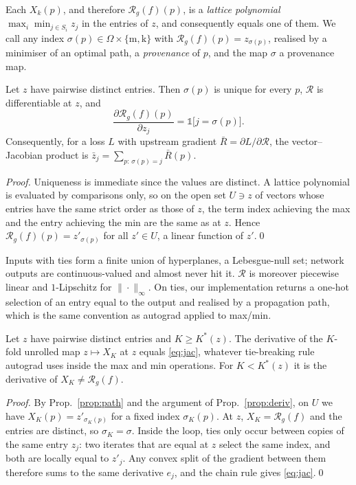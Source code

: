 \documentclass[runningheads]{llncs}
\newcommand{\Rec}{\mathcal{R}}
\newcommand{\dom}{\Omega}
\newcommand{\src}{\sigma}
\begin{document}
Each $X_k(p)$, and therefore $\Rec_g(f)(p)$, is a \emph{lattice polynomial} $\max_i\min_{j\in S_i}z_j$ in the entries of $z$, and consequently equals one of them. We call any index $\src(p)\in\dom\times\{\mathrm m,\mathrm k\}$ with $\Rec_g(f)(p)=z_{\src(p)}$, realised by a minimiser of an optimal path, a \emph{provenance} of $p$, and the map $\src$ a provenance map.

\begin{proposition}[derivative]\label{prop:deriv}
Let $z$ have pairwise distinct entries. Then $\src(p)$ is unique for every $p$, $\Rec$ is differentiable at $z$, and
\begin{equation}
\frac{\partial\Rec_g(f)(p)}{\partial z_j}=\mathbb 1\big[j=\src(p)\big].\label{eq:jac}
\end{equation}
Consequently, for a loss $L$ with upstream gradient $\bar R=\partial L/\partial\Rec$, the vector--Jacobian product is $\bar z_j=\sum_{p:\,\src(p)=j}\bar R(p)$.
\end{proposition}
\begin{proof}
Uniqueness is immediate since the values are distinct. A lattice polynomial is evaluated by comparisons only, so on the open set $U\ni z$ of vectors whose entries have the same strict order as those of $z$, the term index achieving the max and the entry achieving the min are the same as at $z$. Hence $\Rec_g(f)(p)=z'_{\src(p)}$ for all $z'\in U$, a linear function of $z'$.\qed
\end{proof}

Inputs with ties form a finite union of hyperplanes, a Lebesgue-null set; network outputs are continuous-valued and almost never hit it. $\Rec$ is moreover piecewise linear and $1$-Lipschitz for $\|\cdot\|_\infty$. On ties, our implementation returns a one-hot selection of an entry equal to the output and realised by a propagation path, which is the same convention as autograd applied to max/min.

\begin{proposition}\label{prop:unrolled}
Let $z$ have pairwise distinct entries and $K\ge K^\ast(z)$. The derivative of the $K$-fold unrolled map $z\mapsto X_K$ at $z$ equals \eqref{eq:jac}, whatever tie-breaking rule autograd uses inside the max and min operations. For $K<K^\ast(z)$ it is the derivative of $X_K\ne\Rec_g(f)$.
\end{proposition}
\begin{proof}
By Prop.~\ref{prop:path} and the argument of Prop.~\ref{prop:deriv}, on $U$ we have $X_K(p)=z'_{\src_K(p)}$ for a fixed index $\src_K(p)$. At $z$, $X_K=\Rec_g(f)$ and the entries are distinct, so $\src_K=\src$. Inside the loop, ties only occur between copies of the same entry $z_j$: two iterates that are equal at $z$ select the same index, and both are locally equal to $z'_j$. Any convex split of the gradient between them therefore sums to the same derivative $e_j$, and the chain rule gives \eqref{eq:jac}.\qed
\end{proof}
\end{document}
